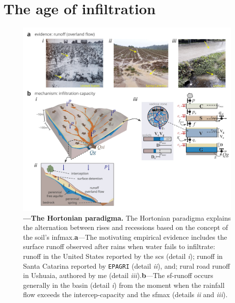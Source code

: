 \documentclass[./main_en.tex]{subfiles}
\begin{document}
\section{The age of infiltration} \label{sec:hydro:mechs}

\begin{figure}[t!] 
\centering				
\includegraphics[width=0.98\linewidth]{figs/fig_horton_en.jpg}		
\caption[The Hortonian \gls{paradigma}]
{
\textbf{---\;The Hortonian \gls{paradigma}.} The Hortonian \gls{paradigma} explains the alternation between rises and recessions based on the concept of the soil’s \gls{infmax}.\;\textbf{a}\;---\;The motivating empirical evidence includes the surface runoff observed after rains when water fails to infiltrate: runoff in the United States reported by the \acrshort{scs} \cite{strahler1986} (detail \textrm{\textit{i}}); runoff in Santa Catarina reported by \texttt{EPAGRI} \cite{epagri2024} (detail \textrm{\textit{ii}}), and; rural road runoff in Ushuaia, authored by me (detail \textrm{\textit{iii}}).\;\textbf{b}\;---\;The \gls{sf-runoff} occurs generally in the basin (detail \textrm{\textit{i}}) from the moment when the rainfall flow exceeds the \gls{intercep-capacity} and the \gls{sfmax} (details \textrm{\textit{ii}} and \textrm{\textit{iii}}).
}
\label{fig:hydro:horton} 		
\end{figure}
\end{document}
